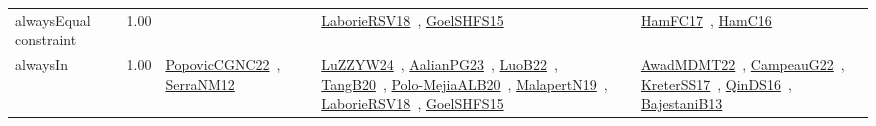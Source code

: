 {\begin{longtable}{p{3cm}r>{\raggedright\arraybackslash}p{6cm}>{\raggedright\arraybackslash}p{6cm}>{\raggedright\arraybackslash}p{8cm}}
\index{alwaysEqual constraint}\index{Constraints!alwaysEqual constraint}alwaysEqual constraint &  1.00 &  & \href{../works/LaborieRSV18.pdf}{LaborieRSV18}~\cite{LaborieRSV18}, \href{../works/GoelSHFS15.pdf}{GoelSHFS15}~\cite{GoelSHFS15} & \href{../works/HamFC17.pdf}{HamFC17}~\cite{HamFC17}, \href{../works/HamC16.pdf}{HamC16}~\cite{HamC16}\\
\index{alwaysIn}\index{Constraints!alwaysIn}alwaysIn &  1.00 & \href{../works/PopovicCGNC22.pdf}{PopovicCGNC22}~\cite{PopovicCGNC22}, \href{../works/SerraNM12.pdf}{SerraNM12}~\cite{SerraNM12} & \href{../works/LuZZYW24.pdf}{LuZZYW24}~\cite{LuZZYW24}, \href{../works/AalianPG23.pdf}{AalianPG23}~\cite{AalianPG23}, \href{../works/LuoB22.pdf}{LuoB22}~\cite{LuoB22}, \href{../works/TangB20.pdf}{TangB20}~\cite{TangB20}, \href{../works/Polo-MejiaALB20.pdf}{Polo-MejiaALB20}~\cite{Polo-MejiaALB20}, \href{../works/MalapertN19.pdf}{MalapertN19}~\cite{MalapertN19}, \href{../works/LaborieRSV18.pdf}{LaborieRSV18}~\cite{LaborieRSV18}, \href{../works/GoelSHFS15.pdf}{GoelSHFS15}~\cite{GoelSHFS15} & \href{../works/AwadMDMT22.pdf}{AwadMDMT22}~\cite{AwadMDMT22}, \href{../works/CampeauG22.pdf}{CampeauG22}~\cite{CampeauG22}, \href{../works/KreterSS17.pdf}{KreterSS17}~\cite{KreterSS17}, \href{../works/QinDS16.pdf}{QinDS16}~\cite{QinDS16}, \href{../works/BajestaniB13.pdf}{BajestaniB13}~\cite{BajestaniB13}\\

\end{longtable}}
